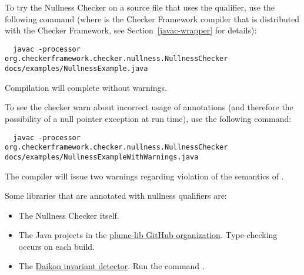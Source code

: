 

To try the Nullness Checker on a source file that uses the  qualifier,
use the following command (where  is the Checker Framework compiler that
is distributed with the Checker Framework, see Section~\ref{javac-wrapper}
for details):

\begin{smaller}
\begin{Verbatim}
  javac -processor org.checkerframework.checker.nullness.NullnessChecker docs/examples/NullnessExample.java
\end{Verbatim}
\end{smaller}

\noindent
Compilation will complete without warnings.

To see the checker warn about incorrect usage of annotations (and therefore the
possibility of a null pointer exception at run time), use the following command:

\begin{mysmall}
\begin{Verbatim}
  javac -processor org.checkerframework.checker.nullness.NullnessChecker docs/examples/NullnessExampleWithWarnings.java
\end{Verbatim}
\end{mysmall}


\noindent
The compiler will issue two warnings regarding violation of the semantics of
.



Some libraries that are annotated with nullness qualifiers are:

\begin{itemize}
\item
The Nullness Checker itself.

\item
The Java projects in the \href{https://github.com/plume-lib/}
{plume-lib GitHub organization}.
Type-checking occurs on each build.

\item
The
\href{http://plse.cs.washington.edu/daikon/}{Daikon invariant detector}.
Run the command .

\end{itemize}


